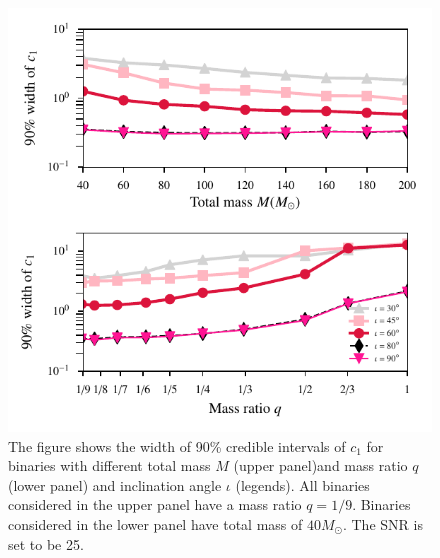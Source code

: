 \documentclass[prd,preprintnumbers,twocolumn,eqsecnum,floatfix,a4paper,nofootinbib,superscriptaddress]{revtex4}
\begin{document}
\begin{figure}[h]
	\begin{center}
		\includegraphics[scale=0.85]{figs/90_percent_CI_c1.pdf}
	\end{center} 
	\caption{The figure shows the width of 90\% credible intervals of $c_1$ for binaries with different total mass $M$ (upper panel)and mass ratio $q$ (lower panel) and inclination angle $\iota$ (legends). All binaries considered in the upper panel have a mass ratio $q=1/9$. Binaries considered in the lower panel have total mass of $40M_{\odot}$. The SNR is set to be 25.  }
	\label{fig:constraint_c1}
\end{figure}
\end{document}
